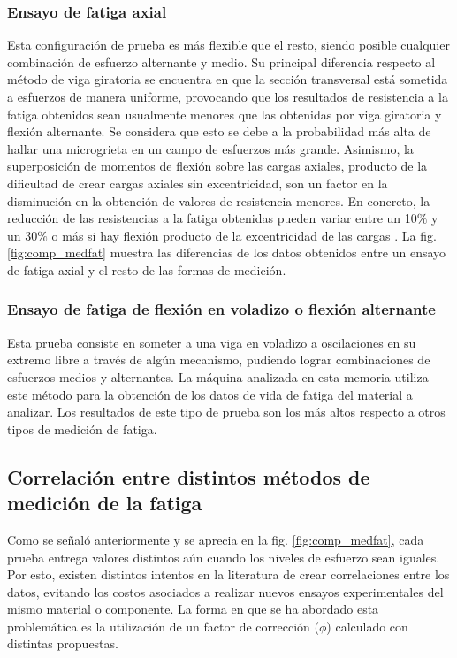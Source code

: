 \subsubsection{Ensayo de fatiga axial}
Esta configuración de prueba es más flexible que el resto, siendo posible cualquier combinación de esfuerzo alternante y medio\cite{norton2011machine}. Su principal diferencia respecto al método de viga giratoria se encuentra en que la sección transversal está sometida a esfuerzos de manera uniforme, provocando que los resultados de resistencia a la fatiga obtenidos sean usualmente menores que las obtenidas por viga giratoria y flexión alternante. Se considera que esto se debe a la  probabilidad más alta de hallar una microgrieta en un campo de esfuerzos más grande. Asimismo, la superposición de momentos de flexión sobre las cargas axiales, producto de la dificultad de crear cargas axiales sin excentricidad, son un factor en la disminución en la obtención de valores de resistencia menores. En concreto, la reducción de las resistencias a la fatiga obtenidas pueden variar entre un 10$\%$ y un 30$\%$ o más si hay flexión producto de la excentricidad de las cargas \cite{bannantine1990fundamentals}. La fig. \ref{fig:comp_medfat} muestra las diferencias de los datos obtenidos entre un ensayo de fatiga axial y el resto de las formas de medición.

\subsubsection{Ensayo de fatiga de flexión en voladizo o flexión alternante}
Esta prueba consiste en someter a una viga en voladizo a oscilaciones en su extremo libre a través de algún mecanismo, pudiendo lograr combinaciones de esfuerzos medios y alternantes. La máquina analizada en esta memoria utiliza este método para la obtención de los datos de vida de fatiga del material a analizar. Los resultados de este tipo de prueba son los más altos respecto a otros tipos de medición de fatiga.

\newpage

\subsection{Correlación entre distintos métodos de medición de la fatiga}
Como se señaló anteriormente y se aprecia en la fig. \ref{fig:comp_medfat}, cada prueba entrega valores distintos aún cuando los niveles de esfuerzo sean iguales. Por esto, existen distintos intentos en la literatura de crear correlaciones entre los datos, evitando los costos asociados a realizar nuevos ensayos experimentales del mismo material o componente. La forma en que se ha abordado esta problemática es la utilización de un factor de corrección ($\phi$) calculado con distintas propuestas.

